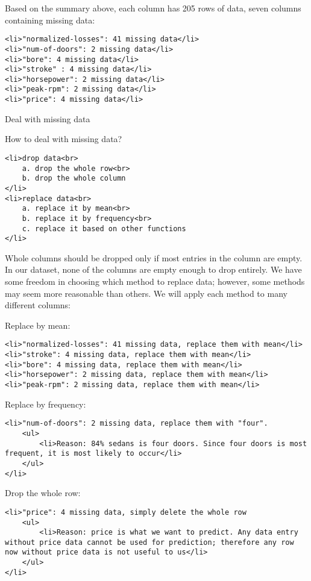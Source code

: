 \documentclass[11pt]{article}
\begin{document}
    Based on the summary above, each column has 205 rows of data, seven
columns containing missing data:

\begin{verbatim}
<li>"normalized-losses": 41 missing data</li>
<li>"num-of-doors": 2 missing data</li>
<li>"bore": 4 missing data</li>
<li>"stroke" : 4 missing data</li>
<li>"horsepower": 2 missing data</li>
<li>"peak-rpm": 2 missing data</li>
<li>"price": 4 missing data</li>
\end{verbatim}

    Deal with missing data

How to deal with missing data?

\begin{verbatim}
<li>drop data<br>
    a. drop the whole row<br>
    b. drop the whole column
</li>
<li>replace data<br>
    a. replace it by mean<br>
    b. replace it by frequency<br>
    c. replace it based on other functions
</li>
\end{verbatim}

    Whole columns should be dropped only if most entries in the column are
empty. In our dataset, none of the columns are empty enough to drop
entirely. We have some freedom in choosing which method to replace data;
however, some methods may seem more reasonable than others. We will
apply each method to many different columns:

Replace by mean:

\begin{verbatim}
<li>"normalized-losses": 41 missing data, replace them with mean</li>
<li>"stroke": 4 missing data, replace them with mean</li>
<li>"bore": 4 missing data, replace them with mean</li>
<li>"horsepower": 2 missing data, replace them with mean</li>
<li>"peak-rpm": 2 missing data, replace them with mean</li>
\end{verbatim}

Replace by frequency:

\begin{verbatim}
<li>"num-of-doors": 2 missing data, replace them with "four". 
    <ul>
        <li>Reason: 84% sedans is four doors. Since four doors is most frequent, it is most likely to occur</li>
    </ul>
</li>
\end{verbatim}

Drop the whole row:

\begin{verbatim}
<li>"price": 4 missing data, simply delete the whole row
    <ul>
        <li>Reason: price is what we want to predict. Any data entry without price data cannot be used for prediction; therefore any row now without price data is not useful to us</li>
    </ul>
</li>
\end{verbatim}
\end{document}
